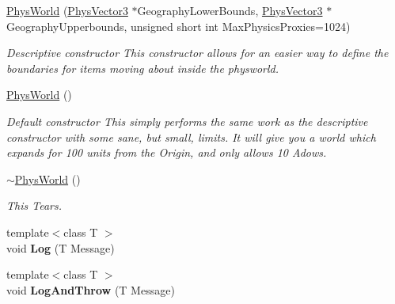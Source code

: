 \begin{DoxyCompactItemize}
\item 
\hyperlink{classPhysWorld_a3228c98369082139722d3c918d735e6c}{PhysWorld} (\hyperlink{classPhysVector3}{PhysVector3} $\ast$GeographyLowerBounds, \hyperlink{classPhysVector3}{PhysVector3} $\ast$GeographyUpperbounds, unsigned short int MaxPhysicsProxies=1024)
\begin{DoxyCompactList}\small\item\em Descriptive constructor This constructor allows for an easier way to define the boundaries for items moving about inside the physworld. \item\end{DoxyCompactList}\item 
\hypertarget{classPhysWorld_a6ded8026b0cd72e7877830698197adf0}{
\hyperlink{classPhysWorld_a6ded8026b0cd72e7877830698197adf0}{PhysWorld} ()}
\label{db/df5/classPhysWorld_a6ded8026b0cd72e7877830698197adf0}

\begin{DoxyCompactList}\small\item\em Default constructor This simply performs the same work as the descriptive constructor with some sane, but small, limits. It will give you a world which expands for 100 units from the Origin, and only allows 10 Adows. \item\end{DoxyCompactList}\item 
\hypertarget{classPhysWorld_acdfe3b4c1c236860dc7dff945cfe5b07}{
\hyperlink{classPhysWorld_acdfe3b4c1c236860dc7dff945cfe5b07}{$\sim$PhysWorld} ()}
\label{db/df5/classPhysWorld_acdfe3b4c1c236860dc7dff945cfe5b07}

\begin{DoxyCompactList}\small\item\em This Tears. \item\end{DoxyCompactList}\item 
\hypertarget{classPhysWorld_a5e9fead1c3100f5dbd5ca985b82b85ea}{
{\footnotesize template$<$class T $>$ }\\void {\bfseries Log} (T Message)}
\label{db/df5/classPhysWorld_a5e9fead1c3100f5dbd5ca985b82b85ea}

\item 
\hypertarget{classPhysWorld_a1c2aeaed2a89821a4545db854da33ab8}{
{\footnotesize template$<$class T $>$ }\\void {\bfseries LogAndThrow} (T Message)}
\label{db/df5/classPhysWorld_a1c2aeaed2a89821a4545db854da33ab8}


\end{DoxyCompactItemize}
